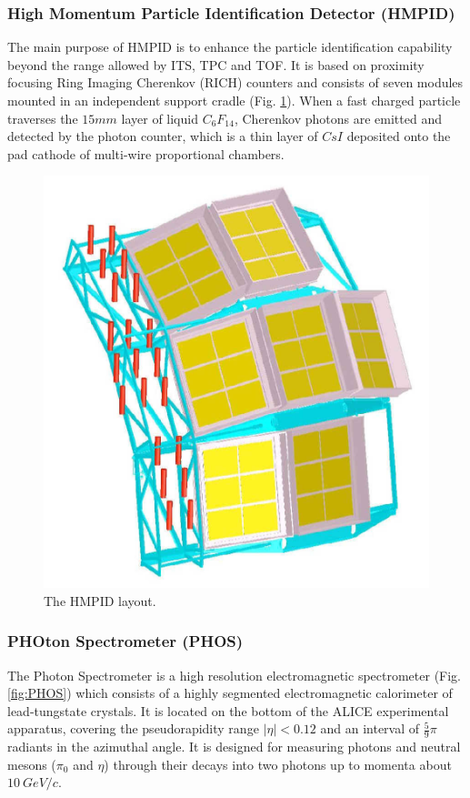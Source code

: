 \subsubsection{High Momentum Particle Identification Detector (HMPID)}
The main purpose of HMPID is to enhance the particle identification capability beyond the range allowed by ITS, TPC and TOF. 
It is based on proximity focusing Ring Imaging Cherenkov (RICH) counters and consists of seven modules mounted in an independent support cradle (Fig. \ref{fig:HMPID}). 
When a fast charged particle traverses the $15 mm$ layer of liquid $C_6F_{14}$, Cherenkov photons are emitted and detected by the photon counter, which is a thin layer of $CsI$ deposited onto the pad cathode of multi-wire proportional chambers.

\begin{figure}[!h]
\begin{center}
\includegraphics[width=0.4\linewidth]{Chapters/Introduction/Figs/hmpid.pdf}
\caption{The HMPID layout.}
\label{fig:HMPID}
\end{center}
\end{figure}

\subsubsection{PHOton Spectrometer (PHOS)}
The Photon Spectrometer is a high resolution electromagnetic spectrometer (Fig. \ref{fig:PHOS}) which consists of a highly segmented electromagnetic calorimeter of lead-tungstate crystals.
It is located on the bottom of the ALICE experimental apparatus, covering the pseudorapidity range $|\eta| < 0.12$ and an interval of $\frac{5}{9}\pi$ radiants in the azimuthal angle.
It is designed for measuring photons and neutral mesons ($\pi_0$ and $\eta$) through their decays into two photons up to momenta about $10\ GeV/c$.

